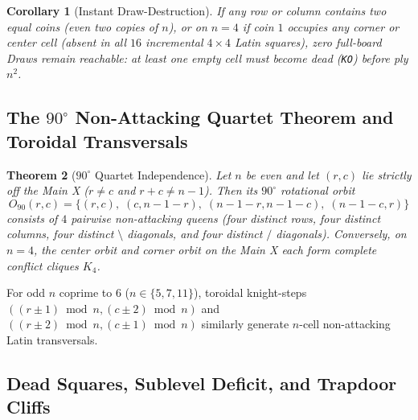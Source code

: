 \documentclass[10pt,a4paper]{article}
\newtheorem{theorem}{Theorem}[section]
\newtheorem{corollary}[theorem]{Corollary}
\theoremstyle{remark}
\begin{document}
\begin{corollary}[Instant Draw-Destruction]\label{cor:draw-death}
If any row or column contains two equal coins (even two copies of $n$), or on $n=4$ if coin $1$ occupies any corner or center cell (absent in all $16$ incremental $4\times 4$ Latin squares), zero full-board Draws remain reachable: at least one empty cell must become dead (\texttt{KO}) before ply $n^2$.
\end{corollary}

\subsection{\texorpdfstring{The $90^\circ$ Non-Attacking Quartet Theorem and Toroidal Transversals}{The 90-Degree Non-Attacking Quartet Theorem and Toroidal Transversals}}

\begin{theorem}[$90^\circ$ Quartet Independence]\label{thm:quartet}
Let $n$ be even and let $(r,c)$ lie strictly off the Main X ($r \ne c$ and $r+c \ne n-1$). Then its $90^\circ$ rotational orbit
\[
  O_{90}(r,c) = \bigl\{(r,c),\; (c,n-1-r),\; (n-1-r,n-1-c),\; (n-1-c,r)\bigr\}
\]
consists of $4$ pairwise non-attacking queens (four distinct rows, four distinct columns, four distinct $\setminus$ diagonals, and four distinct $/$ diagonals). Conversely, on $n=4$, the center orbit and corner orbit on the Main X each form complete conflict cliques $K_4$.
\end{theorem}

For odd $n$ coprime to $6$ ($n \in \{5,7,11\}$), toroidal knight-steps $((r \pm 1)\bmod n, (c \pm 2)\bmod n)$ and $((r \pm 2)\bmod n, (c \pm 1)\bmod n)$ similarly generate $n$-cell non-attacking Latin transversals.

\subsection{Dead Squares, Sublevel Deficit, and Trapdoor Cliffs}
\end{document}
